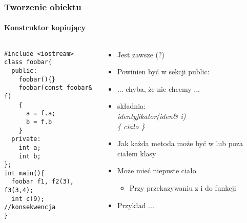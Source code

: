 \documentclass[10pt]{beamer}
\begin{document}
\begin{frame}[fragile]
  \frametitle{Tworzenie obiektu}
  \framesubtitle{Konstruktor kopiujący}
  \begin{columns}
    \begin{column}{0.48\textwidth}
\begin{lstlisting}
#include <iostream>
class foobar{
  public:
    foobar(){}
    foobar(const foobar& f)
    {
      a = f.a;
      b = f.b
    }
  private:
    int a;
    int b;
};
int main(){
  foobar f1, f2(3), f3(3,4);
  int c(9); //konsekwencja
}
\end{lstlisting}
    \end{column}
    \begin{column}{0.48\textwidth}
      \begin{itemize}
        \item Jest zawsze (?)
        \item Powinien być w sekcji public:
        \item ... chyba, że nie chcemy ...
        \item składnia:\\ \textit{identyfikator(iden\& i)
        \\ \{ ciało \}}
        \item Jak każda metoda może być w lub poza ciałem klasy
        \item Może mieć niepuste ciało
		    \begin{itemize}
		    	\item Przy przekazywaniu z i do funkcji
	      \end{itemize}		    
        \item Przykład ...
      \end{itemize}
    \end{column}
  \end{columns}
\end{frame}
\end{document}
